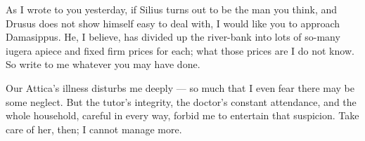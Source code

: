 

 As I wrote to you yesterday, if Silius turns out to be the man you think, and Drusus does not show himself easy to deal with, I would like you to approach Damasippus. He, I believe, has divided up the river-bank into lots of so-many iugera apiece and fixed firm prices for each; what those prices are I do not know. So write to me whatever you may have done.

 Our Attica's illness disturbs me deeply --- so much that I even fear there may be some neglect. But the tutor's integrity, the doctor's constant attendance, and the whole household, careful in every way, forbid me to entertain that suspicion. Take care of her, then; I cannot manage more.
